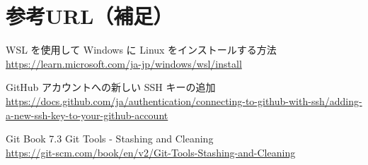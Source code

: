 \documentclass[aspectratio=169,dvipdfmx,cjk]{beamer}
\begin{document}
\section*{参考URL（補足）}
\begin{frame}{\insertsection}
  \scriptsize
  \begin{thebibliography}{99}
  \beamertemplatetextbibitems

   WSL を使用して Windows に Linux をインストールする方法\\
  \href{https://learn.microsoft.com/ja-jp/windows/wsl/install}{https://learn.microsoft.com/ja-jp/windows/wsl/install}
  
   GitHub アカウントへの新しい SSH キーの追加\\
  \href{https://docs.github.com/ja/authentication/connecting-to-github-with-ssh/adding-a-new-ssh-key-to-your-github-account
  }{https://docs.github.com/ja/authentication/connecting-to-github-with-ssh/adding-a-new-ssh-key-to-your-github-account}

   Git Book 7.3 Git Tools - Stashing and Cleaning\\
  \href{https://git-scm.com/book/en/v2/Git-Tools-Stashing-and-Cleaning
  }{https://git-scm.com/book/en/v2/Git-Tools-Stashing-and-Cleaning}

  \end{thebibliography}
\end{frame}
\end{document}
